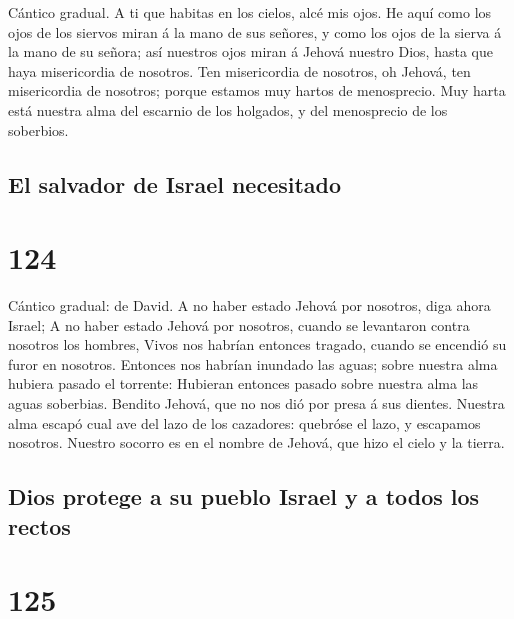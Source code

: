  Cántico gradual. A ti que habitas en los cielos, alcé mis
ojos.  He aquí como los ojos de los siervos miran á la
mano de sus señores, y como los ojos de la sierva á la mano de su
señora; así nuestros ojos miran á Jehová nuestro Dios, hasta que haya
misericordia de nosotros.  Ten misericordia de nosotros,
oh Jehová, ten misericordia de nosotros; porque estamos muy hartos de
menosprecio.  Muy harta está nuestra alma del escarnio de
los holgados, y del menosprecio de los soberbios.

\hypertarget{el-salvador-de-israel-necesitado}{%
\subsection{El salvador de Israel
necesitado}\label{el-salvador-de-israel-necesitado}}

\hypertarget{section-123}{%
\section{124}\label{section-123}}

 Cántico gradual: de David. A no haber estado Jehová por
nosotros, diga ahora Israel;  A no haber estado Jehová por
nosotros, cuando se levantaron contra nosotros los hombres,
 Vivos nos habrían entonces tragado, cuando se encendió su
furor en nosotros.  Entonces nos habrían inundado las
aguas; sobre nuestra alma hubiera pasado el torrente: 
Hubieran entonces pasado sobre nuestra alma las aguas soberbias.
 Bendito Jehová, que no nos dió por presa á sus dientes.
 Nuestra alma escapó cual ave del lazo de los cazadores:
quebróse el lazo, y escapamos nosotros.  Nuestro socorro
es en el nombre de Jehová, que hizo el cielo y la tierra.

\hypertarget{dios-protege-a-su-pueblo-israel-y-a-todos-los-rectos}{%
\subsection{Dios protege a su pueblo Israel y a todos los
rectos}\label{dios-protege-a-su-pueblo-israel-y-a-todos-los-rectos}}

\hypertarget{section-124}{%
\section{125}\label{section-124}}


